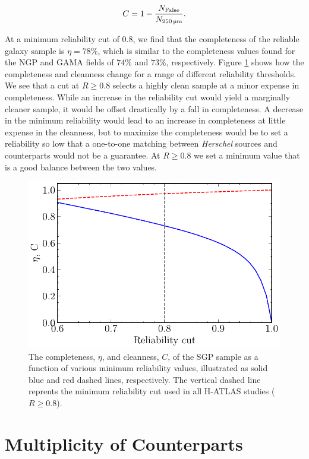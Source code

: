 \begin{equation}
    C = 1 - \frac{N_{\textrm{False}}}{N_{\textrm{250\,\micron}}}.
\label{eq:cleanness}
\end{equation}

At a minimum reliability cut of $0.8$, we find that the completeness of the reliable galaxy sample is $\eta = 78\%$, which is similar to the completeness values found for the NGP and GAMA fields of $74\%$ and $73\%$, respectively. Figure \ref{fig:completeness_and_cleanness} shows how the completeness and cleanness change for a range of different reliability thresholds. We see that a cut at $R \geq 0.8$ selects a highly clean sample at a minor expense in completeness. While an increase in the reliability cut would yield a marginally cleaner sample, it would be offset drastically by a fall in completeness. A decrease in the minimum reliability would lead to an increase in completeness at little expense in the cleanness, but to maximize the completeness would be to set a reliability so low that a one-to-one matching between \textit{Herschel} sources and counterparts would not be a guarantee. At $R \geq 0.8$ we set a minimum value that is a good balance between the two values.

\begin{figure}
    \centering
	\includegraphics[width=0.75\columnwidth]{Figures/completeness_and_cleanness.pdf}
	\caption[Completeness and cleanness of the SGP sample as a function of reliabilty]{The completeness, $\eta$, and cleanness, $C$, of the SGP sample as a function of various minimum reliability values, illustrated as solid blue and red dashed lines, respectively. The vertical dashed line reprents the minimum reliability cut used in all H-ATLAS studies ($R \geq 0.8$).}
	\label{fig:completeness_and_cleanness}
\end{figure}

\section{Multiplicity of Counterparts}
\label{sec:multiplicity}

